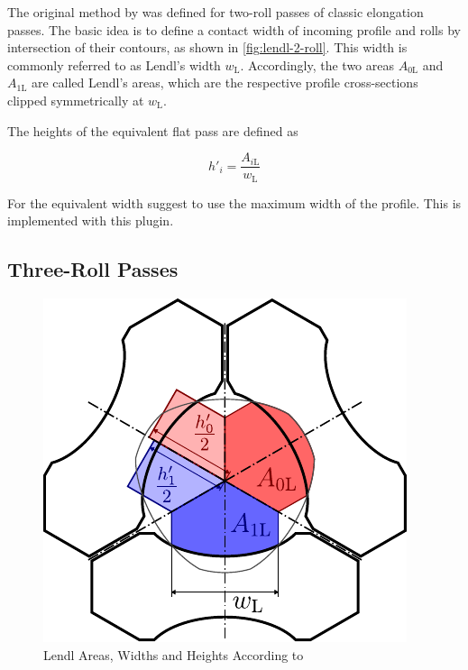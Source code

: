 \documentclass{PyRollDocs}
\begin{document}
    The original method by \textcite{Lendl_1948a, Lendl_1948b, Lendl_1949} was defined for two-roll passes of classic elongation passes.
    The basic idea is to define a contact width of incoming profile and rolls by intersection of their contours, as shown in \autoref{fig:lendl-2-roll}.
    This width is commonly referred to as Lendl's width $w_{\mathrm L}$.
    Accordingly, the two areas $A_{0\mathrm L}$ and $A_{1 \mathrm{L}}$ are called Lendl's areas, which are the respective profile cross-sections clipped symmetrically at $w_{\mathrm L}$.

    The heights of the equivalent flat pass are defined as

    \begin{equation}
        h'_{i} = \frac{A_{i \mathrm L}}{w_{\mathrm L}}
        \label{eq:equivalent_height2}
    \end{equation}

    For the equivalent width \textcite{Mauk_Kopp_1982} suggest to use the maximum width of the profile.
    This is implemented with this plugin.


    \subsection{Three-Roll Passes}

    \begin{figure}
        \centering
        \includegraphics{lendl-3-roll}
        \caption{Lendl Areas, Widths and Heights According to~\cite{Overhagen2014}}
        \label{fig:lendl-3-roll}
    \end{figure}
\end{document}
